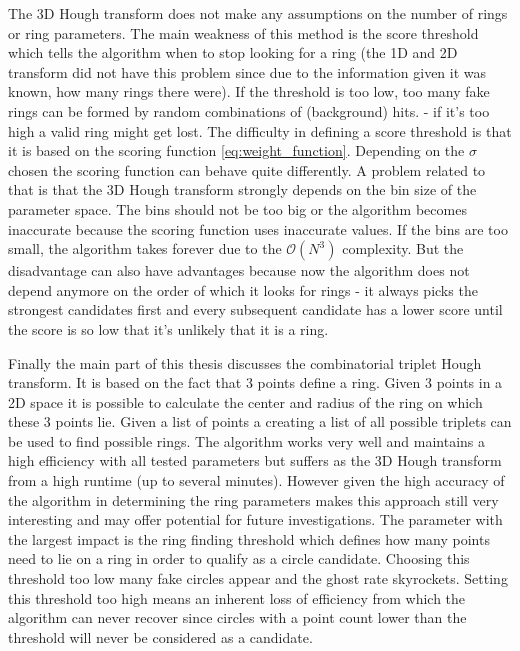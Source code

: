 \documentclass[11pt]{scrreprt}
\begin{document}
The 3D Hough transform does not make any assumptions on the number of rings or ring parameters. The main weakness
of this method is the score threshold which tells the algorithm when to stop looking for a ring (the 1D and 2D transform did not
have this problem since due to the information given it was known, how many rings there were). If the threshold is too low, too many 
fake rings can be formed by random combinations of (background) hits. - if it's too high a valid ring might get lost. The difficulty in defining a score threshold is 
that it is based on the scoring function \ref{eq:weight_function}. Depending on the $\sigma$ chosen the scoring function can behave
quite differently. A problem related to that is that the 3D Hough transform strongly depends on the bin size of the parameter space.
The bins should not be too big or the algorithm becomes inaccurate because the scoring function uses inaccurate values. If the bins are too
small, the algorithm takes forever due to the $\mathcal{O}(N^3)$ complexity. But the disadvantage can also have advantages because
now the algorithm does not depend anymore on the order of which it looks for rings - it always picks the strongest candidates first
and every subsequent candidate has a lower score until the score is so low that it's unlikely that it is a ring.

Finally the main part of this thesis discusses the combinatorial triplet Hough transform. It is based on the fact that 3 points define a ring.
Given 3 points in a 2D space it is possible to calculate the center and radius of the ring on which these 3 points lie. Given a list
of points a creating a list of all possible triplets can be used to find possible rings. The algorithm works very well and maintains a high efficiency
with all tested parameters but suffers as the 3D Hough transform from a high runtime (up to several minutes). However given the high accuracy
of the algorithm in determining the ring parameters makes this approach still very interesting and may offer potential for future investigations.
The parameter with the largest impact is the ring finding threshold which defines how many points need to lie on a ring in order to qualify as a 
circle candidate. Choosing this threshold too low many fake circles appear and the ghost rate skyrockets. Setting this threshold too high
means an inherent loss of efficiency from which the algorithm can never recover since circles with a point count lower than the threshold
will never be considered as a candidate.
\end{document}
